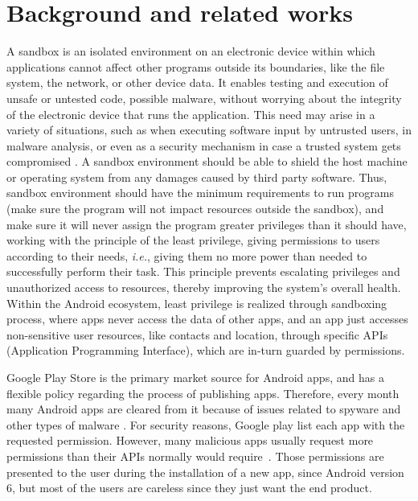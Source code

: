 \section{Background and related works}

A sandbox is an isolated environment on an electronic device within which applications cannot affect other programs outside its boundaries, like the file system, the network, or other device data. It enables testing and execution of unsafe or untested code, possible malware, without worrying about the integrity of the electronic device that runs the application. This need may arise in a variety of situations, such as when executing software input by untrusted users, in malware analysis, or even as a security mechanism in case a trusted system gets compromised \cite{DBLP:journals/peerj-cs/MaassSCS16}.
A sandbox environment should be able to shield the host machine or operating system from any damages caused by third party software. Thus, sandbox environment should have the minimum requirements to run programs (make sure the program will not impact resources outside the sandbox), and make sure it will never assign the program greater privileges than it should have, 
working with the principle of the least privilege, giving permissions to users according to their needs, \textit{i.e.}, giving them no more power than needed to successfully perform their task. This principle prevents escalating privileges and unauthorized access to resources, thereby improving the system's overall health. Within the Android ecosystem, least privilege is realized through sandboxing process, where apps never access the data of other apps, and an app just accesses non-sensitive user resources, like contacts and location, through specific APIs (Application Programming Interface), which are in-turn guarded by permissions.

Google Play Store is the primary market source for Android apps, and has a flexible policy regarding the process of publishing apps. Therefore, every month many Android apps are cleared from it because of issues related to spyware and other types of malware \cite{DBLP:conf/msr/WangLL0X18}. For security reasons, Google play list each app with the requested permission. However, many malicious apps usually request more permissions than their APIs normally would require~\cite{DBLP:conf/ccs/FeltCHSW11}. Those permissions are presented to the user during the installation of a new app, since Android version 6, but most of the users are careless since they just want the end product.~\cite{DBLP:conf/soups/FeltHEHCW12} 

